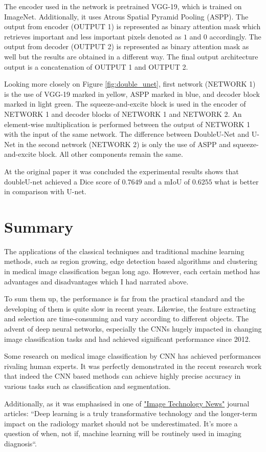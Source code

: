The encoder used in the network is pretrained VGG-19, which is trained on ImageNet. Additionally, it uses Atrous Spatial Pyramid Pooling (ASPP). The output from encoder (OUTPUT 1) is represented as binary attention mask which retrieves important and less important pixels denoted as $1$ and $0$ accordingly. The output from decoder (OUTPUT 2) is represented as binary attention mask as well but the results are obtained in a different way. The final output architecture output is a concatenation of OUTPUT 1 and OUTPUT 2.

Looking more closely on Figure \ref{fig:double_unet}, first network (NETWORK 1) is the use of VGG-19 marked in yellow, ASPP marked in blue, and decoder block marked in light green. The squeeze-and-excite block is used in the encoder of NETWORK 1 and decoder blocks of NETWORK 1 and NETWORK 2. An element-wise multiplication is performed between the output of NETWORK 1 with the input of the same network. The difference between DoubleU-Net and U-Net in the second network (NETWORK 2) is only the use of ASPP and squeeze-and-excite block. All other components remain the same.

At the original paper \cite{Jha2020} it was concluded the experimental results shows that doubleU-net achieved a Dice score of $0.7649$ and a mIoU of $0.6255$ what is better in comparison with U-net. 

\section{Summary}
The applications of the classical techniques and traditional machine learning methods, such as region growing, edge detection based algorithms and clustering in medical image classification began long ago. However, each certain method has advantages and disadvantages which I had narrated above. 

To sum them up, the performance is far from the practical standard and the developing of them is quite slow in recent years. Likewise, the feature extracting and selection are time-consuming and vary according to different objects. The advent of deep neural networks, especially the CNNs hugely impacted in changing image classification tasks and had achieved significant performance since 2012.

Some research on medical image classification by CNN has achieved performances rivaling human experts. It was perfectly demonstrated in the recent research work \cite{Anwar2018} that indeed the CNN based methods can achieve highly precise accuracy in various tasks such as classification and segmentation. 

Additionally, as it was emphasised in one of  \href{https://www.itnonline.com/content/deep-learning-medical-imaging-create-300-million-market-2021}{\color{blue}"Image Technology News"} journal articles: ``Deep learning is a truly transformative technology and the longer-term impact on the radiology market should not be underestimated. It’s more a question of when, not if, machine learning will be routinely used in imaging diagnosis``. 


